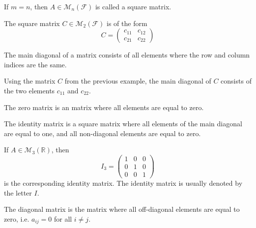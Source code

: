 \begin{definition}\label{def-square-matrix}
	If $m = n$, then $A\in\mathcal{M}_n(\mathcal{F})$ is called a square matrix.
\end{definition}

\begin{exm}
	The square matrix $C\in\mathcal{M}_2(\mathcal{F})$ is of the form
	\begin{equation*}
		C = \begin{pmatrix}
			c_{11} & c_{12} \\
			c_{21} & c_{22}
		\end{pmatrix}
	\end{equation*}
\end{exm}

\begin{definition}\label{def-main-diagonal}
	The main diagonal of a matrix consists of all elements where the
	row and column indices are the same.
\end{definition}

\begin{exm}
	Using the matrix $C$ from the previous example, the main diagonal of $C$
	consists of the two elements $c_{11}$ and $c_{22}$.
\end{exm}

\begin{definition}\label{def-zero-matrix}
	The zero matrix is an matrix where all elements are equal to zero.
\end{definition}

\begin{definition}\label{def-identity-matrix}
	The identity matrix is a square matrix where all elements of the main diagonal
	are equal to one, and all non-diagonal elements are equal to zero.
\end{definition}

\begin{exm}
	If $A\in\mathcal{M}_3(\mathbb{R})$, then
	\begin{equation*}
		I_3 = \begin{pmatrix}
			1 & 0 & 0 \\
			0 & 1 & 0 \\
			0 & 0 & 1
		\end{pmatrix}
	\end{equation*}
	is the corresponding identity matrix. The identity matrix is usually denoted
	by the letter $I$.
\end{exm}

\begin{definition}\label{def-diagonal-matrix}
	The diagonal matrix is the matrix where all off-diagonal elements are equal
	to zero, i.e. $a_{ij}=0$ for all $i \neq j$.
\end{definition}

